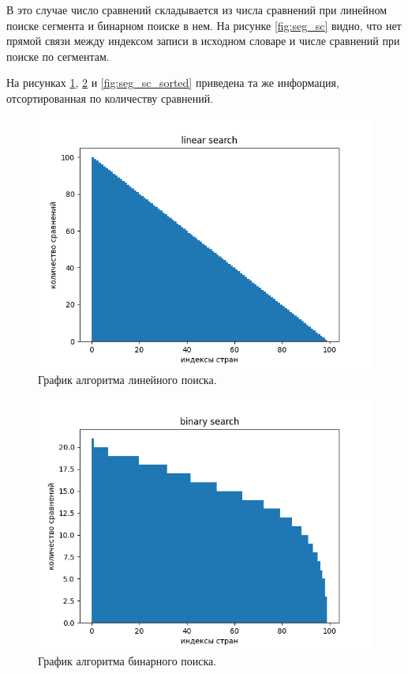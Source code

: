В это случае число сравнений складывается из числа сравнений при линейном поиске сегмента и бинарном поиске в нем. На рисунке \ref{fig:seg_sc} видно, что нет прямой связи между индексом записи в исходном словаре и числе сравнений при поиске по сегментам.


На рисунках \ref{fig:lin_sc_sorted}, \ref{fig:bin_sc_sorted} и \ref{fig:seg_sc_sorted} приведена та же информация, отсортированная по количеству сравнений.

\begin{figure}[H]
	\centering
	\includegraphics[scale=0.7]{inc/lin_sorted.png}
	\caption{График алгоритма линейного поиска.}
	\label{fig:lin_sc_sorted}
\end{figure}

\begin{figure}[H]
	\centering
	\includegraphics[scale=0.7]{inc/bin_sorted.png}
	\caption{График алгоритма бинарного поиска.}
	\label{fig:bin_sc_sorted}
\end{figure}


